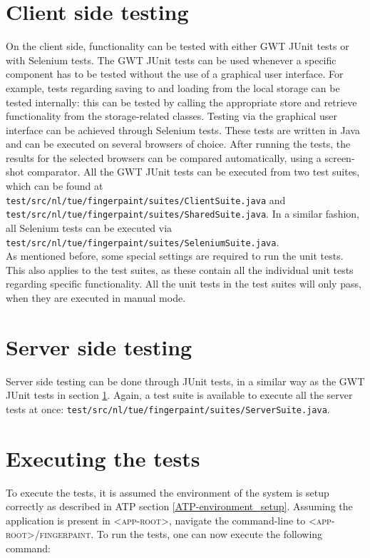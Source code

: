 \section{Client side testing}\label{sec:clientProc}
On the client side, functionality can be tested with either GWT JUnit tests or with Selenium tests. The GWT JUnit tests can be used whenever a specific component has to be tested without the use of a graphical user interface. For example, tests regarding saving to and loading from the local storage can be tested internally: this can be tested by calling the appropriate store and retrieve functionality from the storage-related classes. Testing via the graphical user interface can be achieved through Selenium tests. These tests are written in Java and can be executed on several browsers of choice. After running the tests, the results for the selected browsers can be compared automatically, using a screen-shot comparator.
All the GWT JUnit tests can be executed from two test suites, which can be found at \texttt{test/src/nl/tue/fingerpaint/suites/ClientSuite.java} and \texttt{test/src/nl/tue/fingerpaint/suites/SharedSuite.java}. In a similar fashion, all Selenium tests can be executed via \texttt{test/src/nl/tue/fingerpaint/suites/SeleniumSuite.java}. \\
As mentioned before, some special settings are required to run the unit tests. This also applies to the test suites, as these contain all the individual unit tests regarding specific functionality. All the unit tests in the test suites will only pass, when they are executed in manual mode.

\section{Server side testing}\label{sec:serverProc}
Server side testing can be done through JUnit tests, in a similar way as the GWT JUnit tests in section \ref{sec:clientProc}. Again, a test suite is available to execute all the server tests at once: \texttt{test/src/nl/tue/fingerpaint/suites/ServerSuite.java}.

\section{Executing the tests}\label{sec:exectest}
To execute the tests, it is assumed the environment of the system is setup correctly as described in ATP section \ref*{ATP-environment_setup}. 
Assuming the application is present in \textsc{<app-root>}, navigate the command-line to \textsc{<app-root>/fingerpaint}. To run the tests, one
can now execute the following command:


